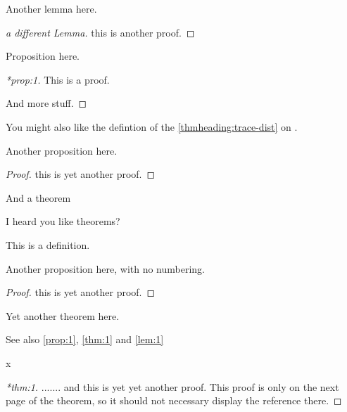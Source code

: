 \documentclass[12pt,a5paper]{article}
\begin{document}
\begin{lemma}
\label{lem:1}
Another lemma here.
\end{lemma}
\begin{proof}[a different Lemma]
  this is another proof.
\end{proof}


\begin{proposition}
  \label{prop:1}
  Proposition here.
\end{proposition}
\begin{proof}[*prop:1]
  This is a proof.

  And more stuff.
\end{proof}


You might also like the defintion of the \ref{thmheading:trace-dist} on .

\begin{proposition}
\noproofref
Another proposition here.
\end{proposition}
\begin{proof}
  this is yet another proof.
\end{proof}


\begin{theorem}
\label{thm:1}
And a theorem
\end{theorem}


\begin{theorem}
\noproofref
\label{thm:2}
I heard you like theorems?
\end{theorem}

\begin{definition*}
\label{def:1}
This is a definition.
\end{definition*}


\begin{proposition*}
Another proposition here, with no numbering.
\end{proposition*}
\begin{proof}
  this is yet another proof.
\end{proof}

\begin{theorem}
  \label{thm:another}
  Yet another theorem here.
\end{theorem}


See also \autoref{prop:1}, \autoref{thm:1} and \autoref{lem:1}

\cleardoublepage
x
\begin{proof}[*thm:1]
  ....... and this is yet yet another proof.  This proof is only on the next page of the
  theorem, so it should not necessary display the reference there.
\end{proof}
\end{document}
